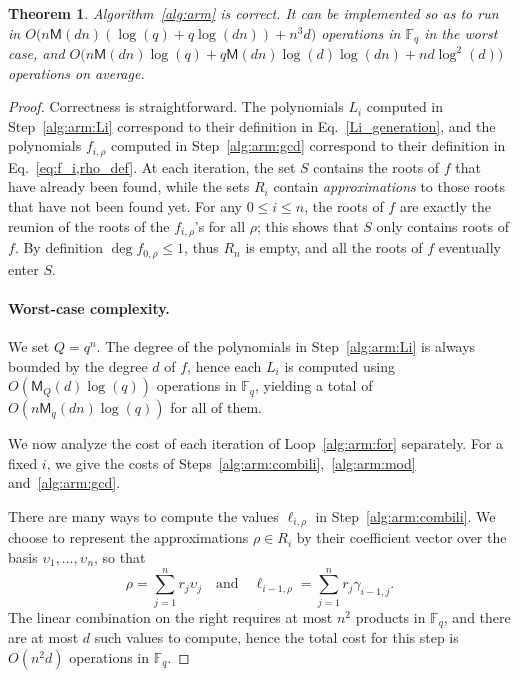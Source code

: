 \documentclass{article}
\newcommand{\ff}[1]{\mathbb{F}_{#1}}
\newcommand{\qq}{q}
\newcommand{\basef}{\ff{\qq}}
\newcommand{\Mul}{\mathsf{M}}
\newtheorem{Theo}{Theorem}
\begin{document}
\begin{Theo}
  \label{th:arm}
  Algorithm~\ref{alg:arm} is correct. It can be implemented so as to
  run in $O\bigl(n\Mul(dn)(\log(q) + q\log(dn)) + n^3d\bigr)$
  operations in $\basef$ in the worst case, and
  $O\bigl(n\Mul(dn)\log(q) + q\Mul(dn)\log(d)\log(dn) +
  nd\log^2(d)\bigr)$ operations on average.
\end{Theo}
\begin{proof}
  Correctness is straightforward. The polynomials $L_i$ computed in
  Step~\ref{alg:arm:Li} correspond to their definition in
  Eq.~\eqref{Li_generation}, and the polynomials $f_{i,\rho}$ computed
  in Step~\ref{alg:arm:gcd} correspond to their definition in
  Eq.~\eqref{eq:f_i,rho_def}. %
  At each iteration, the set $S$ contains the roots of $f$ that have
  already been found, while the sets $R_i$ contain
  \emph{approximations} to those roots that have not been found yet. %
  For any $0\le i\le n$, the roots of $f$ are exactly the reunion of
  the roots of the $f_{i,\rho}$'s for all $\rho$; this shows that $S$
  only contains roots of $f$. %
  By definition $\deg f_{0,\rho}\le 1$, thus $R_n$ is empty, and all
  the roots of $f$ eventually enter $S$.

  \paragraph{Worst-case complexity.} We set $Q=q^n$.  The degree of the
  polynomials in Step~\ref{alg:arm:Li} is always bounded by the degree
  $d$ of $f$, hence each $L_i$ is computed using
  $O(\Mul_Q(d)\log(q))$ operations in $\basef$, yielding a total of
  $O(n\Mul_q(dn)\log(q))$ for all of them.

  We now analyze the cost of each iteration of Loop~\ref{alg:arm:for}
  separately. For a fixed $i$, we give the costs of
  Steps~\ref{alg:arm:combili},~\ref{alg:arm:mod}
  and~\ref{alg:arm:gcd}.

  There are many ways to compute the values $\ell_{i,\rho}$ in
  Step~\ref{alg:arm:combili}. We choose to represent the
  approximations $\rho\in R_i$ by their coefficient vector over the
  basis $\upsilon_1,\dots,\upsilon_n$, so that
  \[
    \rho = \sum_{j=1}^n r_j\upsilon_j 
    \quad\text{and}\quad
    \ell_{i-1,\rho} = \sum_{j=1}^n r_j\gamma_{i-1,j}.
  \]
  The linear combination on the right requires at most $n^2$ products
  in $\basef$, and there are at most $d$ such values to compute, hence
  the total cost for this step is $O(n^2d)$ operations in $\basef$.


\end{proof}
\end{document}
